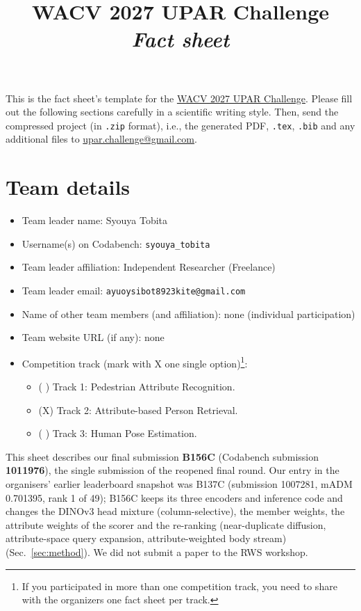 \documentclass[a4paper, 10pt, conference]{ieeeconf}
\title{WACV 2027 UPAR Challenge\\ \textit{Fact sheet}}
\begin{document}
\maketitle
This is the fact sheet's template for the \href{https://vap.aau.dk/rws/challenge/}{WACV 2027 UPAR Challenge}. Please fill out the following sections carefully in a scientific writing style. Then, send the compressed project (in \texttt{.zip} format), i.e., the generated PDF, \texttt{.tex}, \texttt{.bib} and any additional files to \url{upar.challenge@gmail.com}.
%
%

%
\section{Team details}\label{teamdetails}
\begin{itemize}
    \item Team leader name: Syouya Tobita
    \item Username(s) on Codabench: \texttt{syouya\_tobita}
    \item Team leader affiliation: Independent Researcher (Freelance)
    \item Team leader email: \texttt{ayuoysibot8923kite@gmail.com}
    \item Name of other team members (and affiliation): none (individual participation)
    \item Team website URL (if any): none
    \item Competition track (mark with X one single option)\footnote{If you participated in more than one competition track, you need to share with the organizers one fact sheet per track.}:
    \begin{itemize}
        \item ( ) Track 1: Pedestrian Attribute Recognition.
        \item (X) Track 2: Attribute-based Person Retrieval.
        \item ( ) Track 3: Human Pose Estimation.
    \end{itemize}
\end{itemize}
This sheet describes our final submission \textbf{B156C} (Codabench submission \textbf{1011976}), the single submission of the reopened final round. Our entry in the organisers' earlier leaderboard snapshot was B137C (submission 1007281, mADM 0.701395, rank 1 of 49); B156C keeps its three encoders and inference code and changes the DINOv3 head mixture (column-selective), the member weights, the attribute weights of the scorer and the re-ranking (near-duplicate diffusion, attribute-space query expansion, attribute-weighted body stream) (Sec.~\ref{sec:method}). We did not submit a paper to the RWS workshop.
%
%
\end{document}
